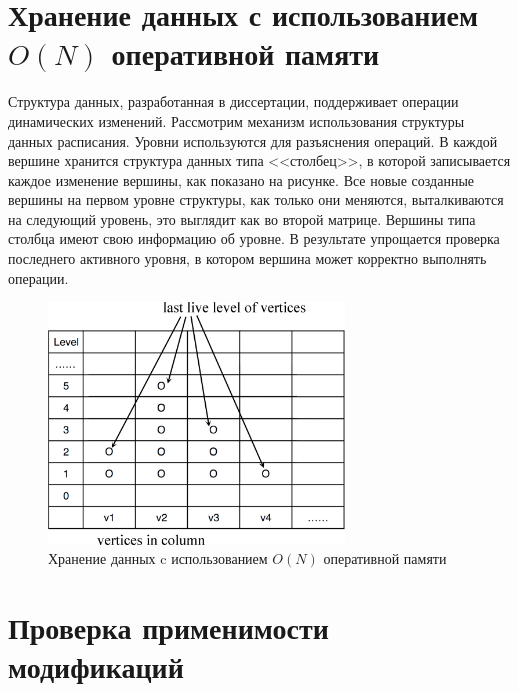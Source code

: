 \documentclass[specification,annotation]{itmo-student-thesis}
\begin{document}

\section{Хранение данных с использованием $O(N)$ оперативной памяти}


Структура данных, разработанная в диссертации, поддерживает операции динамических изменений. Рассмотрим механизм использования структуры данных расписания. Уровни используются для разъяснения операций. 
В каждой вершине хранится структура данных типа <<столбец>>, в которой записывается каждое изменение вершины, как показано на рисунке. Все новые созданные вершины на первом уровне структуры, как только 
они меняются, выталкиваются на следующий уровень, это выглядит как во второй матрице. Вершины типа столбца имеют свою информацию об уровне. В результате упрощается проверка последнего активного
уровня, в котором вершина может корректно выполнять операции.


\begin{figure}[!ht]
\centering
\includegraphics[width=0.7\textwidth]{pic/vertices_in_column.png}
\caption{Хранение данных c использованием $O(N)$ оперативной памяти}\label{fig:memory}
\end{figure}

\section{Проверка применимости модификаций}
\end{document}
